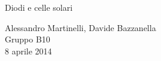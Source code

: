 \begin{center}

     	{\huge Diodi e celle solari}

	\vspace{0.3cm}

      	{\large Alessandro Martinelli, Davide Bazzanella} \\
     	\vspace{0.2cm}
		{\huge Gruppo B10} \\
	
	\vspace{0.1cm}
      	{8 aprile 2014}

\end{center}
